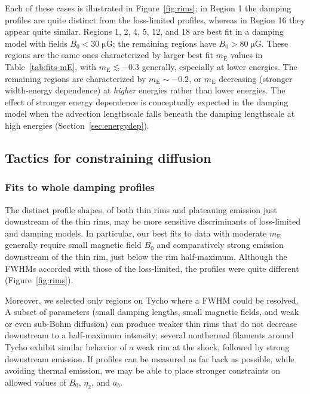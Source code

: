 \documentclass[iop, apj, numberedappendix]{emulateapj}
\newcommand*{\mt}{\mathrm}
\newcommand*{\unit}[1]{\;\mt{#1}}  %
\newcommand*{\mE}{m_\mt{E}}
\newcommand*{\muG}{\unit{\mu G}}
\begin{document}
Each of these cases is illustrated in Figure~\ref{fig:rims}; in Region 1 the
damping profiles are quite distinct from the loss-limited profiles, whereas in
Region 16 they appear quite similar.  Regions 1, 2, 4, 5, 12, and 18 are best
fit in a damping model with fields $B_0 < 30 \muG$; the remaining regions have
$B_0 > 80 \muG$.  These regions are the same ones characterized by larger best
fit $\mE$ values in Table~\ref{tab:fits-mE}, with $\mE \lesssim -0.3$
generally, especially at lower energies.  The remaining regions are
characterized by $\mE \sim -0.2$, or $\mE$ decreasing (stronger width-energy
dependence) at \emph{higher} energies rather than lower energies.  The effect
of stronger energy dependence is conceptually expected in the damping model
when the advection lengthscale falls beneath the damping lengthscale at high
energies (Section~\ref{sec:energydep}).

\subsection{Tactics for constraining diffusion}

\subsubsection{Fits to whole damping profiles}

The distinct profile shapes, of both thin rims and plateauing emission just
downstream of the thin rims, may be more sensitive discriminants of
loss-limited and damping models.  In particular, our best fits to data with
moderate $\mE$ generally require small magnetic field $B_0$ and comparatively
strong emission downstream of the thin rim, just below the rim half-maximum.
Although the FWHMs accorded with those of the loss-limited, the profiles were
quite different (Figure~\ref{fig:rims}).

Moreover, we selected only regions on Tycho where a FWHM could be resolved.
A subset of parameters (small damping lengths, small magnetic fields, and weak
or even sub-Bohm diffusion) can produce weaker thin rims that do not decrease
downstream to a half-maximum intensity; several nonthermal filaments around
Tycho exhibit similar behavior of a weak rim at the shock, followed by strong
downstream emission.  If profiles can be measured as far back as possible,
while avoiding thermal emission, we may be able to place stronger constraints
on allowed values of $B_0$, $\eta_2$, and $a_b$.
\end{document}
